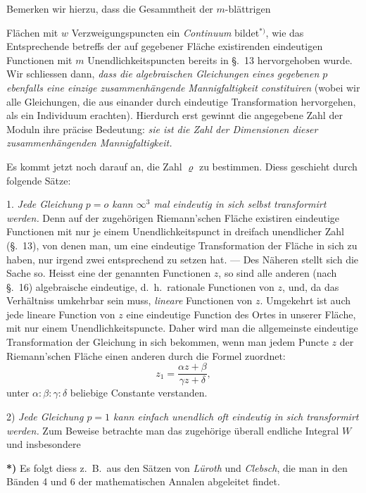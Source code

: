 \documentclass{article}
\begin{document}
Bemerken wir hierzu, dass die Gesammtheit der $m$-blättrigen

Flächen mit $w$ Verzweigungspuncten ein \emph{Continuum} bildet${}^{*)}$, wie das Entsprechende betreffs der auf gegebener Fläche existirenden eindeutigen Functionen mit $m$ Unendlichkeitspuncten bereits in §.~13 hervorgehoben wurde. Wir schliessen dann, \emph{dass die algebraischen Gleichungen eines gegebenen $p$ ebenfalls eine einzige zusammenhängende Mannigfaltigkeit constituiren} (wobei wir alle Gleichungen, die aus einander durch eindeutige Transformation hervorgehen, als ein Individuum erachten). Hierdurch erst gewinnt die angegebene Zahl der Moduln ihre präcise Bedeutung: \emph{sie ist die Zahl der Dimensionen dieser zusammenhängenden Mannigfaltigkeit.}

Es kommt jetzt noch darauf an, die Zahl $\varrho$ zu bestimmen. Diess geschieht durch folgende Sätze:

1. \emph{Jede Gleichung $p = o$ kann $\infty^{3}$ mal eindeutig in sich selbst transformirt werden.} Denn auf der zugehörigen Riemann'schen Fläche existiren eindeutige Functionen mit nur je einem Unendlichkeitspunct in dreifach unendlicher Zahl (§.~13), von denen man, um eine eindeutige Transformation der Fläche in sich zu haben, nur irgend zwei entsprechend zu setzen hat. --- Des Näheren stellt sich die Sache so. Heisst eine der genannten Functionen $z$, so sind alle anderen (nach §.~16) algebraische eindeutige, d.\ h.\ rationale Functionen von $z$, und, da das Verhältniss umkehrbar sein muss, \emph{lineare} Functionen von $z$. Umgekehrt ist auch jede lineare Function von $z$ eine eindeutige Function des Ortes in unserer Fläche, mit nur einem Unendlichkeitspuncte. Daher wird man die allgemeinste eindeutige Transformation der Gleichung in sich bekommen, wenn man jedem Puncte $z$ der Riemann'schen Fläche einen anderen durch die Formel zuordnet:
\[ z_{1} = \frac{\alpha z + \beta}{\gamma z + \delta}, \]
unter $\alpha : \beta : \gamma : \delta$ beliebige Constante verstanden.

2) \emph{Jede Gleichung $p = 1$ kann einfach unendlich oft eindeutig in sich transformirt werden.} Zum Beweise betrachte man das zugehörige überall endliche Integral $W$ und insbesondere

\textbf{*)} Es folgt diess z.\ B.\ aus den Sätzen von \emph{Lüroth} und \emph{Clebsch}, die man in den Bänden 4 und 6 der mathematischen Annalen abgeleitet findet.
\end{document}
